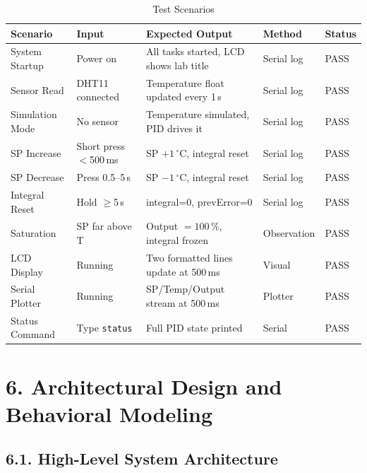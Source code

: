 \documentclass[12pt]{article}
\begin{document}
\begin{table}[H]
    \centering
    \small
    \caption{Test Scenarios}
    \begin{tabular}{|p{3cm}|p{2.8cm}|p{2.8cm}|p{2cm}|p{1.5cm}|}
        \hline
        \textbf{Scenario} & \textbf{Input} & \textbf{Expected Output} & \textbf{Method} & \textbf{Status} \\
        \hline
        System Startup & Power on & All tasks started, LCD shows lab title & Serial log & PASS \\
        \hline
        Sensor Read & DHT11 connected & Temperature float updated every 1\,s & Serial log & PASS \\
        \hline
        Simulation Mode & No sensor & Temperature simulated, PID drives it & Serial log & PASS \\
        \hline
        SP Increase & Short press $<$500\,ms & SP $+1\,^\circ$C, integral reset & Serial log & PASS \\
        \hline
        SP Decrease & Press 0.5--5\,s & SP $-1\,^\circ$C, integral reset & Serial log & PASS \\
        \hline
        Integral Reset & Hold $\geq$5\,s & integral=0, prevError=0 & Serial log & PASS \\
        \hline
        Saturation & SP far above T & Output $=100\,\%$, integral frozen & Observation & PASS \\
        \hline
        LCD Display & Running & Two formatted lines update at 500\,ms & Visual & PASS \\
        \hline
        Serial Plotter & Running & SP/Temp/Output stream at 500\,ms & Plotter & PASS \\
        \hline
        Status Command & Type \texttt{status} & Full PID state printed & Serial & PASS \\
        \hline
    \end{tabular}
\end{table}

\section*{6. Architectural Design and Behavioral Modeling}

\subsection*{6.1. High-Level System Architecture}
\end{document}
